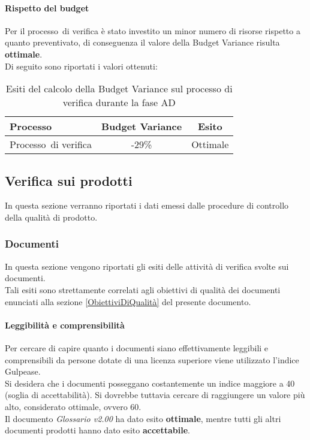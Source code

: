 \documentclass[../PianoDiQualifica.tex]{subfiles}
\begin{document}
\begin{appendices}
			\paragraph{Rispetto del budget}
			Per il processo\g\ di verifica è stato investito un minor numero di risorse rispetto a quanto preventivato, di conseguenza il valore della Budget Variance risulta \textbf{ottimale}.\\
			Di seguito sono riportati i valori ottenuti:
			\begin{table}[H]
				\centering
				\begin{tabular}{l * {2}{c}}
					\toprule
					\textbf{Processo} & \textbf{Budget Variance} & \textbf{Esito} \\
					\midrule
					Processo\g\ di verifica & -29\% &  Ottimale \\
					\bottomrule
				\end{tabular}
				\caption{Esiti del calcolo della Budget Variance sul processo di verifica durante la fase AD}
				\label{tab:esiti_budget_variance}
			\end{table}
			
			
	\subsection{Verifica sui prodotti}
	In questa sezione verranno riportati i dati emessi dalle procedure di controllo della qualità di prodotto\g.
		\subsubsection{Documenti}
		In questa sezione vengono riportati gli esiti delle attività di verifica svolte sui documenti.\\
		Tali esiti sono strettamente correlati agli obiettivi di qualità dei documenti enunciati alla sezione \ref{ObiettiviDiQualità} del presente documento.
			
			\paragraph{Leggibilità e comprensibilità}
			Per cercare di capire quanto i documenti siano effettivamente leggibili e comprensibili da persone dotate di una licenza superiore viene utilizzato l’indice Gulpease\g.\\
			Si desidera che i documenti posseggano costantemente un indice maggiore a 40 (soglia di accettabilità). Si dovrebbe tuttavia cercare di raggiungere un valore più alto, considerato ottimale, ovvero 60.\\
			Il documento \textit{Glossario v2.00} ha dato esito \textbf{ottimale}, mentre tutti gli altri documenti prodotti hanno dato esito \textbf{accettabile}.
			

\end{appendices}
\end{document}
